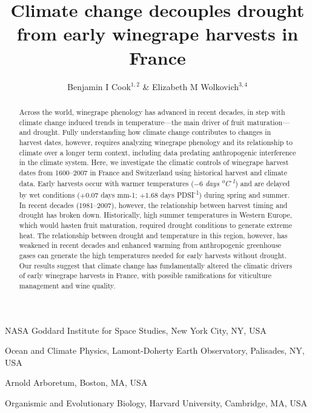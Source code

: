 \documentclass[final]{nature}
\title{Climate change decouples drought from early winegrape harvests in France}
\author{Benjamin I Cook$^{1,2}$ \& Elizabeth M Wolkovich$^{3,4}$} %
\begin{document}
\maketitle

\begin{affiliations}
 \item NASA Goddard Institute for Space Studies, New York City, NY, USA
 \item Ocean and Climate Physics, Lamont-Doherty Earth Observatory, Palisades, NY, USA
 \item Arnold Arboretum, Boston, MA, USA
 \item Organismic and Evolutionary Biology, Harvard University, Cambridge, MA, USA
\end{affiliations}

\begin{abstract} %
Across the world, winegrape phenology has advanced in recent decades\cite{Duchene:2005bd,Seguin2005,webb2011}, in step with climate change induced trends in temperature---the main driver of fruit maturation---and drought. Fully understanding how climate change contributes to changes in harvest dates, however, requires analyzing winegrape phenology and its relationship to climate over a longer term context, including data predating anthropogenic interference in the climate system. Here, we investigate the climatic controls of winegrape harvest dates from 1600--2007 in France and Switzerland using historical harvest\cite{Daux2012} and climate data\cite{Luterbacher2004,CookOWDA2015,Pauling2006}. Early harvests occur with warmer temperatures ($-6$ \emph{days \textsuperscript{o}C\textsuperscript{-1}}) and are delayed by wet conditions ($+0.07$ days mm{-1}; $+1.68$ days PDSI\textsuperscript{-1}) during spring and summer. In recent decades (1981--2007), however, the relationship between harvest timing and drought has broken down. Historically, high summer temperatures in Western Europe, which would hasten fruit maturation, required drought conditions to generate extreme heat. The relationship between drought and temperature in this region, however, has weakened in recent decades and enhanced warming from anthropogenic greenhouse gases can generate the high temperatures needed for early harvests without drought. Our results suggest that climate change has fundamentally altered the climatic drivers of early winegrape harvests in France, with possible ramifications for viticulture management and wine quality.
\end{abstract}
\end{document}
